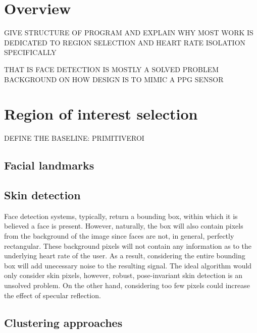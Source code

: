 \section{Overview}
GIVE STRUCTURE OF PROGRAM AND EXPLAIN WHY MOST WORK IS DEDICATED TO REGION
SELECTION AND HEART RATE ISOLATION SPECIFICALLY

THAT IS FACE DETECTION IS MOSTLY A SOLVED PROBLEM
BACKGROUND ON HOW DESIGN IS TO MIMIC A PPG SENSOR


\section{Region of interest selection}
DEFINE THE BASELINE: PRIMITIVEROI
\subsection{Facial landmarks}
\subsection{Skin detection}
Face detection systems, typically, return a bounding box, within which it is believed
a face is present. However, naturally, the box will also contain pixels from the background of 
the image since faces are not, in general, perfectly rectangular.
These background pixels will not contain any information as to the underlying heart rate of the user.
As a result, considering the entire bounding box will add unecessary noise to the resulting signal.
The ideal algorithm would only consider skin pixels, however, robust, pose-invariant skin detection is an unsolved problem.
On the other hand, considering too few pixels could increase the effect of specular reflection.

\subsection{Clustering approaches}

